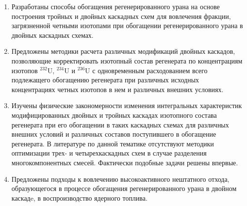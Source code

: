 {\novelty}
\begin{enumerate}
  \item Разработаны способы обогащения регенерированного урана на основе построения тройных и двойных каскадных схем для вовлечения фракции, загрязненной четными изотопами при обогащении регенерированного урана в двойных каскадных схемах.
  \item Предложены методики расчета различных модификаций двойных каскадов, позволяющие корректировать изотопный состав регенерата по концентрациям изотопов $^{232}$U, $^{234}$U и $^{236}$U с одновременным расходованием всего подлежащего обогащению регенерата при различных исходных концентрациях четных изотопов в нем и различных внешних условиях.
  \item Изучены физические закономерности изменения интегральных характеристик модифицированных двойных и тройных каскадах изотопного состава регенерата при его обогащении в таких каскадных схемах для различных внешних условий и различных составов поступившего в обогащение регенерата. В литературе по данной тематике отсутствуют методики оптимизации трех- и четырехкаскадных схем в случае разделения многокомпонентных смесей. Фактически подобные задачи решены впервые.
  \item Предложены подходы к вовлечению высокоактивного нештатного отхода, образующегося в процессе обогащения регенерированного урана в двойном каскадe, в воспроизводство ядерного топлива.
\end{enumerate}

